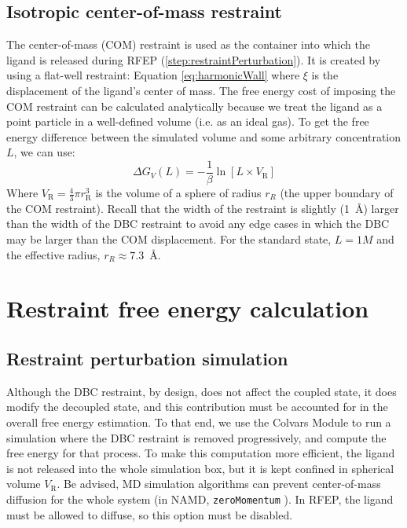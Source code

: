 \documentclass[9pt,tutorial]{Styling/livecoms}
\newcommand{\textInput}[1]{
  \texttt{#1}
}
\begin{document}
\subsection{Isotropic center-of-mass restraint} \label{app:COMCorrection}
The center-of-mass (COM) restraint is used as the container into which the ligand is released during RFEP (\ref{step:restraintPerturbation}). It is created by using a flat-well restraint: Equation \ref{eq:harmonicWall} where $\xi$ is the displacement of the ligand's center of mass.
The free energy cost of imposing the COM restraint can be calculated analytically because we treat the ligand as a point particle in a well-defined volume (i.e. as an ideal gas).
To get the free energy difference between the simulated volume and some arbitrary concentration $L$, we can use:
 \begin{equation}\label{eq:dGV}
     \Delta G_V(L)=-\frac{1}{\beta} \ln [L \times V_\mathrm{R}]
 \end{equation}
Where $V_\mathrm{R}=\frac{4}{3}\pi r_\mathrm{R}^{3}$ is the volume of a sphere of radius $r_R$ (the upper boundary of the COM restraint). \cite{Salari2018} 
Recall that the width of the restraint is slightly (1~\AA{}) larger than the width of the DBC restraint to avoid any edge cases in which the DBC may be larger than the COM displacement. For the standard state, $L=1M$ and the effective radius, $r_R\approx7.3$~\AA{}.

\section{Restraint free energy calculation}\label{app:RFEP}

\subsection{Restraint perturbation simulation}

Although the DBC restraint, by design, does not affect the coupled state, it does modify the decoupled state, and this contribution must be accounted for in the overall free energy estimation. To that end, we use the Colvars Module to run a simulation where the DBC restraint is removed progressively, and compute the free energy for that process.
To make this computation more efficient, the ligand is not released into the whole simulation box, but it is kept confined in spherical volume $V_\mathrm{R}$. Be advised, MD simulation algorithms can prevent center-of-mass diffusion for the whole system (in NAMD, \textInput{zeroMomentum}). In RFEP, the ligand must be allowed to diffuse, so this option must be disabled.
\end{document}
